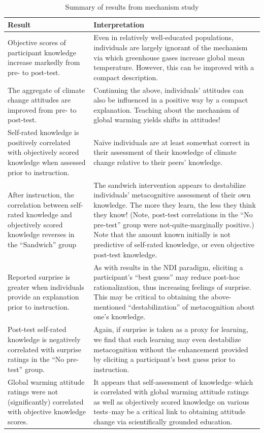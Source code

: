 \begin{table}
\begin{tabular}{p{}p{}}
Result & Interpretation \\ \hline \hline
Objective scores of participant knowledge increase markedly from pre- to
post-test. & Even in relatively well-educated populations, individuals are
largely ignorant of the mechanism via which greenhouse gases increase global
mean temperature. However, this can be improved with a compact description. \\ \hline
The aggregate of climate change attitudes are improved from pre- to post-test. &
Continuing the above, individuals’ attitudes can also be influenced in a
positive way by a compact explanation. Teaching about the mechanism of global
warming yields shifts in attitudes! \\ \hline
Self-rated knowledge is positively correlated with objectively scored knowledge
when assessed prior to instruction. & Naïve individuals are at least somewhat
correct in their assessment of their knowledge of climate change relative to
their peers’ knowledge. \\ \hline
After instruction, the correlation between self-rated knowledge and objectively
scored knowledge reverses in the “Sandwich” group  & The sandwich intervention
appears to destabilize individuals’ metacognitive assessment of their own
knowledge. The more they learn, the less they think they know! (Note, post-test
correlations in the “No pre-test” group were not-quite-marginally positive.)
Note that the amount known initially is not predictive of self-rated knowledge,
or even objective post-test knowledge. \\ \hline 
Reported surprise is greater when individuals provide an explanation prior to
instruction. & As with results in the NDI paradigm, eliciting a participant’s
“best guess” may reduce post-hoc rationalization, thus increasing feelings of
surprise. This may be critical to obtaining the above-mentioned
“destabilization” of metacognition about one’s knowledge.  \\ \hline
Post-test self-rated knowledge is negatively correlated with surprise ratings in
the “No pre-test” group. & Again, if surprise is taken as a proxy for learning,
we find that such learning may even destabilize metacognition without the
enhancement provided by eliciting a participant’s best guess prior to
instruction.  \\ \hline
Global warming attitude ratings were not (significantly) correlated with
objective knowledge scores. &
It appears that self-assessment of knowledge--which is correlated with global
warming attitude ratings as well as objectively scored knowledge on various
tests--may be a critical link to obtaining attitude change via scientifically
grounded education. \\ \hline
\end{tabular}
\caption{Summary of results from mechanism study}
\label{table:mech-summary}
\end{table}

